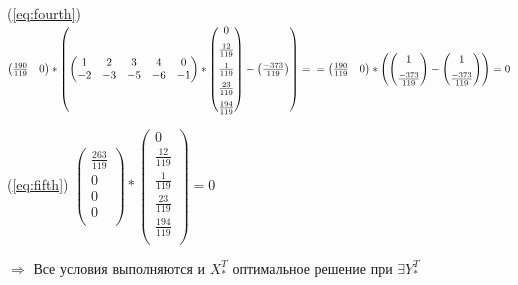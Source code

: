 \documentclass[../body.tex]{subfiles}
\begin{document}
	(\ref{eq:fourth})
	$ 
	\begin{pmatrix}
		\frac{190}{119} & 0
	\end{pmatrix} * \left(
	\begin{pmatrix}
	1 & 2 & 3 & 4 & 0\\
	-2 & -3 & -5 & -6 & -1\\ 
	\end{pmatrix}*
	\begin{pmatrix}
		0 \\[0.2cm] \frac{12}{119} \\[0.2cm] \frac{1}{119} \\[0.2cm] \frac{23}{119} \\[0.2cm] \frac{194}{119} \\
	\end{pmatrix} - 
	\begin{pmatrix}
	\frac{-373}{119}
	\end{pmatrix}
	 \right)= \\=
	\begin{pmatrix}
		\frac{190}{119} &  0
	\end{pmatrix}*
	\left(
	\begin{pmatrix}
		1\\[0.2cm] \frac{-373}{119} 
	\end{pmatrix}
	-
	\begin{pmatrix}
			1\\[0.2cm] \frac{-373}{119} 
	\end{pmatrix}
	 \right) = 0
	 $
	 \checkmark\\
	\vspace{\baselineskip}
	
	(\ref{eq:fifth})
	$
	 \begin{pmatrix}
	\frac{263}{119}\\[0.2cm] 0\\[0.2cm]  0\\[0.2cm]  0\\[0.2cm]   
	\end{pmatrix} *
	 \begin{pmatrix}
	0 \\[0.2cm] \frac{12}{119} \\[0.2cm] \frac{1}{119} \\[0.2cm] \frac{23}{119} \\[0.2cm] \frac{194}{119} \\
	\end{pmatrix} =0 $
	 \checkmark\\
	 \vspace{\baselineskip}
	 
	 $\Longrightarrow $
	 Все условия выполняются и $X_*^T$ оптимальное решение при $\exists Y_*^T$  
\end{document}
